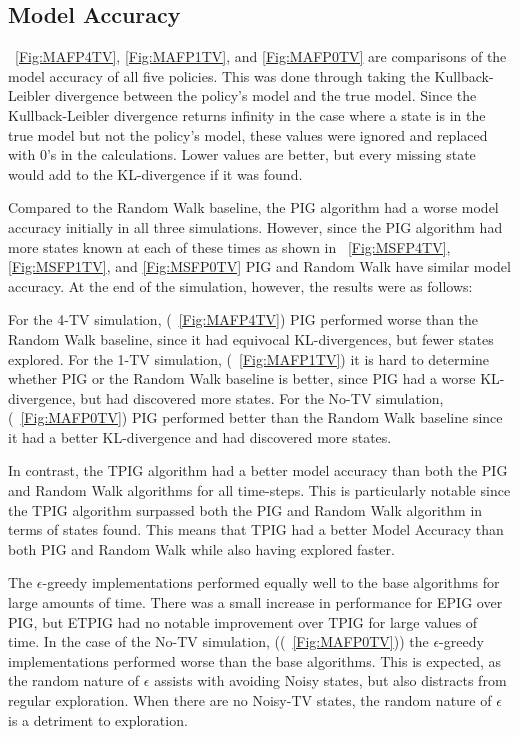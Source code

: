 \documentclass[letterpaper]{article} %
\begin{document}
\subsection{Model Accuracy}
\figurename~\ref{Fig:MAFP4TV}, \ref{Fig:MAFP1TV}, and \ref{Fig:MAFP0TV} are comparisons of the model accuracy of all five policies. This was done through taking the Kullback-Leibler divergence between the policy's model and the true model. Since the Kullback-Leibler divergence returns infinity in the case where a state is in the true model but not the policy's model, these values were ignored and replaced with 0's in the calculations. Lower values are better, but every missing state would add to the KL-divergence if it was found.

Compared to the Random Walk baseline, the PIG algorithm had a worse model accuracy initially in all three simulations. However, since the PIG algorithm had more states known at each of these times as shown in \figurename~\ref{Fig:MSFP4TV}, \ref{Fig:MSFP1TV}, and \ref{Fig:MSFP0TV} PIG and Random Walk have similar model accuracy. At the end of the simulation, however, the results were as follows:

For the 4-TV simulation, (\figurename~\ref{Fig:MAFP4TV}) PIG performed worse than the Random Walk baseline, since it had equivocal KL-divergences, but fewer states explored. For the 1-TV simulation, (\figurename~\ref{Fig:MAFP1TV}) it is hard to determine whether PIG or the Random Walk baseline is better, since PIG had a worse KL-divergence, but had discovered more states. For the No-TV simulation, (\figurename~\ref{Fig:MAFP0TV}) PIG performed better than the Random Walk baseline since it had a better KL-divergence and had discovered more states.

In contrast, the TPIG algorithm had a better model accuracy than both the PIG and Random Walk algorithms for all time-steps. This is particularly notable since the TPIG algorithm surpassed both the PIG and Random Walk algorithm in terms of states found. This means that TPIG had a better Model Accuracy than both PIG and Random Walk while also having explored faster.

The $\epsilon$-greedy implementations performed equally well to the base algorithms for large amounts of time. There was a small increase in performance for EPIG over PIG, but ETPIG had no notable improvement over TPIG for large values of time. In the case of the No-TV simulation, ((\figurename~\ref{Fig:MAFP0TV})) the $\epsilon$-greedy implementations performed worse than the base algorithms. This is expected, as the random nature of $\epsilon$ assists with avoiding Noisy states, but also distracts from regular exploration. When there are no Noisy-TV states, the random nature of $\epsilon$ is a detriment to exploration.
\end{document}
